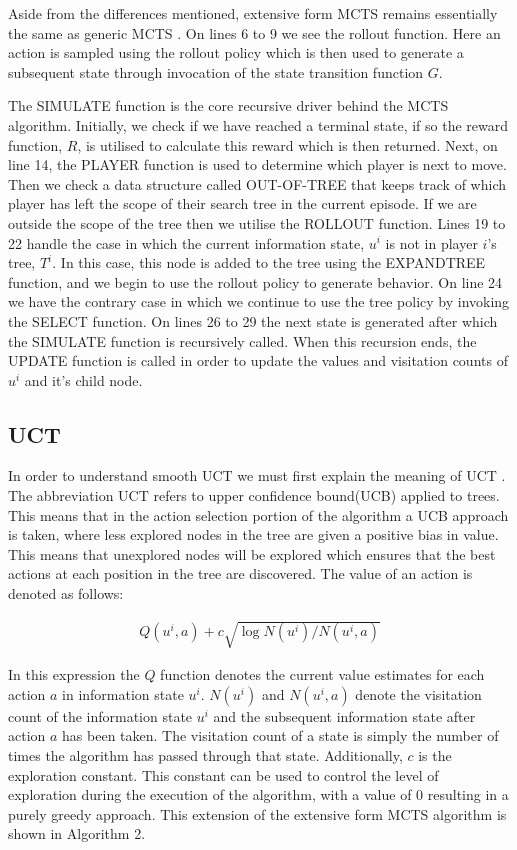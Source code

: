 Aside from the differences mentioned, extensive form MCTS remains essentially the same as generic MCTS .
On lines 6 to 9 we see the rollout function.
Here an action is sampled using the rollout policy which is then used to generate a subsequent
state through invocation of the state transition function $G$.

The SIMULATE function is the core recursive driver behind the MCTS algorithm.
Initially, we check if we have reached a terminal state, if so the reward function,
$R$, is utilised to calculate this reward which is then returned.
Next, on line 14, the PLAYER function is used to determine which player is next to move.
Then we check a data structure called OUT-OF-TREE that keeps track of which player has
left the scope of their search tree in the current episode\citep{heinrich2017reinforcement}.
If we are outside the scope of the tree then we utilise the ROLLOUT function.
Lines 19 to 22 handle the case in which the current information state, $u^i$ is
not in player $i$'s tree, $T^i$.
In this case, this node is added to the tree using the EXPANDTREE function, and we begin
to use the rollout policy to generate behavior.
On line 24 we have the contrary case in which we continue to use the tree policy by
invoking the SELECT function.
On lines 26 to 29 the next state is generated after which the SIMULATE function is recursively
called.
When this recursion ends, the UPDATE function is called in order to update the
values and visitation counts of $u^{i}$ and it's child node.


\subsection{UCT}\label{subsec:UCT}
In order to understand smooth UCT we must first explain the meaning of UCT .
The abbreviation UCT refers to upper confidence bound(UCB) applied to trees.
This means that in the action selection portion of the algorithm a UCB approach 
is taken, where less explored nodes in the tree are given a positive bias in value.
This means that unexplored nodes will be explored which ensures that
the best actions at each position in the tree are discovered.
The value of an action is denoted as follows:

\begin{align}
Q(u^i, a) + c \sqrt{\log N(u^i) / N(u^i, a)} 
\end{align}

In this expression the $Q$ function denotes the current value estimates for each action $a$ 
in information state $u^i$.
$N(u^i)$ and $N(u^i, a)$ denote the visitation count of the information state $u^i$
and the subsequent information state after action $a$ has been taken.
The visitation count of a state is simply the number of times the algorithm has passed
through that state.
Additionally, $c$ is the exploration constant.
This constant can be used to control the level of exploration during the execution of the algorithm,
with a value of 0 resulting in a purely greedy approach.
This extension of the extensive form MCTS algorithm is shown in Algorithm 2.

